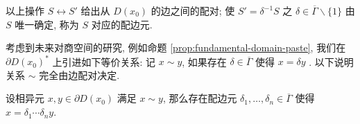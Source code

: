 \begin{definition-proposition}[边配对]\label{prop:side-pairing} 
	以上操作 $S \leftrightarrow S'$ 给出从 $D(x_0)$ 的边之间的配对; 使 $S' = \delta^{-1} S$ 之 $\delta \in \overline{\Gamma} \smallsetminus \{1\}$ 由 $S$ 唯一确定, 称为 $S$ 对应的配边元.
\end{definition-proposition}

考虑到未来对商空间的研究, 例如命题 \ref{prop:fundamental-domain-paste}, 我们在 $\partial D(x_0)^*$ 上引进如下等价关系: 记 $x \sim y$, 如果存在 $\delta \in \overline{\Gamma}$ 使得 $x = \delta y$ . 以下说明关系 $\sim$ 完全由边配对决定.
\begin{proposition}\label{prop:pairing-pasting}
	设相异元 $x, y \in \partial D(x_0)$ 满足 $x \sim y$, 那么存在配边元 $\delta_1, \ldots, \delta_n \in \overline{\Gamma}$ 使得 $x = \delta_1 \cdots \delta_n y$.
\end{proposition}

